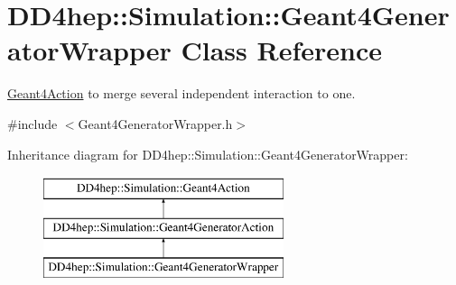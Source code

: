 \hypertarget{class_d_d4hep_1_1_simulation_1_1_geant4_generator_wrapper}{}\section{D\+D4hep\+:\+:Simulation\+:\+:Geant4\+Generator\+Wrapper Class Reference}
\label{class_d_d4hep_1_1_simulation_1_1_geant4_generator_wrapper}


\hyperlink{class_d_d4hep_1_1_simulation_1_1_geant4_action}{Geant4\+Action} to merge several independent interaction to one.  




{\ttfamily \#include $<$Geant4\+Generator\+Wrapper.\+h$>$}

Inheritance diagram for D\+D4hep\+:\+:Simulation\+:\+:Geant4\+Generator\+Wrapper\+:\begin{figure}[H]
\begin{center}
\leavevmode
\includegraphics[height=3.000000cm]{class_d_d4hep_1_1_simulation_1_1_geant4_generator_wrapper}
\end{center}
\end{figure}
